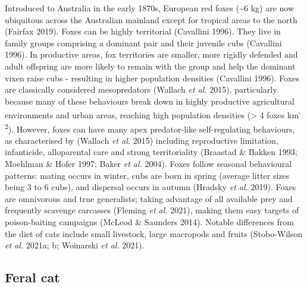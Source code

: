 \documentclass[11pt,a4paper,titlepage,twoside,openright]{style/unimelbthesis}
\begin{document}
\begin{mainmatter}
Introduced to Australia in the early 1870s, European red foxes (\textasciitilde6 kg) are now ubiquitous across the Australian mainland except for tropical areas to the north (Fairfax 2019). Foxes can be highly territorial (Cavallini 1996). They live in family groups comprising a dominant pair and their juvenile cubs (Cavallini 1996). In productive areas, fox territories are smaller, more rigidly defended and adult offspring are more likely to remain with the group and help the dominant vixen raise cubs - resulting in higher population densities (Cavallini 1996). Foxes are classically considered mesopredators (Wallach \emph{et al.} 2015), particularly because many of these behaviours break down in highly productive agricultural environments and urban areas, reaching high population densities (\textgreater{} 4 foxes km\textsuperscript{-2}). However, foxes can have many apex predator-like self-regulating behaviours, as characterised by (Wallach \emph{et al.} 2015) including reproductive limitation, infanticide, alloparental care and strong territoriality (Braastad \& Bakken 1993; Moehlman \& Hofer 1997; Baker \emph{et al.} 2004). Foxes follow seasonal behavioural patterns: mating occurs in winter, cubs are born in spring (average litter sizes being 3 to 6 cubs), and dispersal occurs in autumn (Hradsky \emph{et al.} 2019). Foxes are omnivorous and true generalists; taking advantage of all available prey and frequently scavenge carcasses (Fleming \emph{et al.} 2021), making them easy targets of poison-baiting campaigns (McLeod \& Saunders 2014). Notable differences from the diet of cats include small livestock, large macropods and fruits (Stobo-Wilson \emph{et al.} 2021a; b; Woinarski \emph{et al.} 2021).

\hypertarget{feral-cat}{%
\subsection{Feral cat}\label{feral-cat}}


\end{mainmatter}
\end{document}
